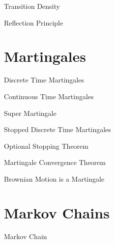 \documentclass[11pt,a4paper]{article}
\begin{document}
\begin{definition}{Transition Density}

\end{definition}

\begin{theorem}{Reflection Principle}

\end{theorem}

\section{Martingales}

\begin{definition}{Discrete Time Martingales}

\end{definition}

\begin{definition}{Continuous Time Martingales}

\end{definition}

\begin{definition}{Super Martingale}

\end{definition}

\begin{definition}{Stopped Discrete Time Martingales}

\end{definition}

\begin{theorem}{Optional Stopping Theorem}

\end{theorem}

\begin{theorem}{Martingale Convergence Theorem}

\end{theorem}

\begin{remark}{Brownian Motion is a Martingale}

\end{remark}

\section{Markov Chains}

\begin{definition}{Markov Chain}
\end{definition}
\end{document}
